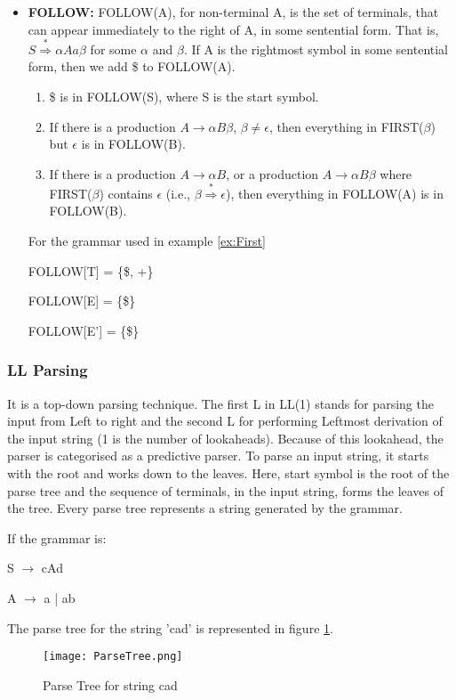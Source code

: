 \begin{itemize}
\item \textbf{FOLLOW:} FOLLOW(A), for non-terminal A, is the set of terminals, that can appear immediately to the right of A, in some sentential form. That is, $S\overset{*}{\Rightarrow}\alpha Aa\beta$ for some $\alpha$ and $\beta$. If A is the rightmost symbol in some sentential form, then we add \$ to FOLLOW(A).
\begin{enumerate}
\item \$ is in FOLLOW(S), where S is the start symbol. %
\item If there is a production $A\to\alpha B\beta$, $\beta\neq\epsilon$, then everything in FIRST($\beta$) but $\epsilon$ is in FOLLOW(B).
\item If there is a production $A\to\alpha B$, or a production $A\to\alpha B\beta$ where FIRST($\beta$) contains $\epsilon$ (i.e., $\beta\overset{*}{\Rightarrow}\epsilon$), then everything in FOLLOW(A) is in FOLLOW(B).
\end{enumerate}

\begin{example}
\label{ex:Follow}
For the grammar used in example \ref{ex:First}

FOLLOW[T] = \{\$, +\}

FOLLOW[E] = \{\$\}

FOLLOW[E'] = \{\$\}
\end{example}
\end{itemize}

\subsubsection{LL Parsing}
\label{ssubsec:LL Parsing}
It is a top-down parsing technique. The first L in LL(1) stands for parsing the input from Left to right and the second L for performing Leftmost derivation of the input string (1 is the number of lookaheads). Because of this lookahead, the parser is categorised as a predictive parser. To parse an input string, it starts with the root and works down to the leaves. Here, start symbol is the root of the parse tree and the sequence of terminals, in the input string, forms the leaves of the tree. Every parse tree represents a string generated by the grammar.
\begin{example}
If the grammar is:

S $\to$ cAd

A $\to$ a | ab

The parse tree for the string 'cad' is represented in figure \ref{fig:Parse Tree}.
\begin{figure}
\centering
\texttt{[image: ParseTree.png]}
\caption{Parse Tree for string cad}
\label{fig:Parse Tree}
\end{figure}

\end{example}

